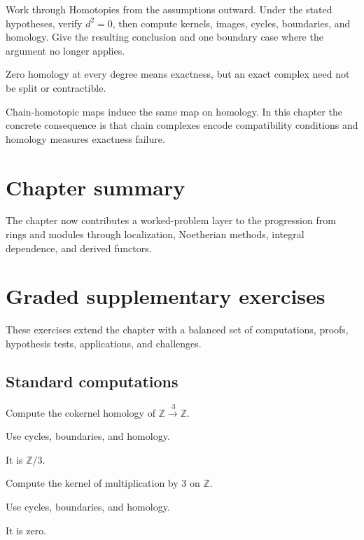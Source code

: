 \begin{exercise}\label{exr:v22-08}
Work through Homotopies from the assumptions outward. Under the stated hypotheses, verify \(d^2=0\), then compute kernels, images, cycles, boundaries, and homology. Give the resulting conclusion and one boundary case where the argument no longer applies.
\end{exercise}
\begin{hint}
Zero homology at every degree means exactness, but an exact complex need not be split or contractible.
\end{hint}
\begin{solution}
Chain-homotopic maps induce the same map on homology. In this chapter the concrete consequence is that chain complexes encode compatibility conditions and homology measures exactness failure.
\end{solution}

\section*{Chapter summary}
The chapter now contributes a worked-problem layer to the progression from rings and modules through localization, Noetherian methods, integral dependence, and derived functors.
\section{Graded supplementary exercises}
These exercises extend the chapter with a balanced set of computations, proofs, hypothesis tests, applications, and challenges.

\subsection*{Standard computations}

\begin{exercise}[Homology]\label{exr:v22-expand-01}
Compute the cokernel homology of $\mathbb Z\xrightarrow{\cdot3}\mathbb Z$.
\end{exercise}
\begin{hint}
Use cycles, boundaries, and homology.
\end{hint}
\begin{solution}
It is $\mathbb Z/3$.
\end{solution}

\begin{exercise}\label{exr:v22-expand-02}
Compute the kernel of multiplication by $3$ on $\mathbb Z$.
\end{exercise}
\begin{hint}
Use cycles, boundaries, and homology.
\end{hint}
\begin{solution}
It is zero.
\end{solution}

